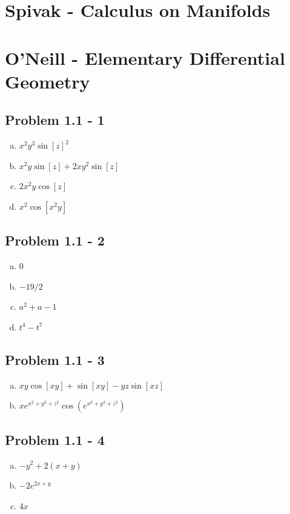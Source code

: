 \documentclass[10pt,a4paper]{book}
\theoremstyle{definition}
\begin{document}
\section{{\sc Spivak} - Calculus on Manifolds}

\section{{\sc O'Neill} - Elementary Differential Geometry}
\subsection{Problem 1.1 - 1}
\begin{enumerate}[(a)]
\item $x^2 y^3 \sin[z]^2$
\item $x^2 y \sin[z] + 2 x y^2 \sin[z]$
\item $2 x^2 y \cos[z]$
\item $x^2 \cos[x^2 y]$
\end{enumerate}

\subsection{Problem 1.1 - 2}
\begin{enumerate}[(a)]
\item $0$
\item $-19/2$
\item $a^2+a-1$
\item $t^4-t^7$
\end{enumerate}

\subsection{Problem 1.1 - 3}
\begin{enumerate}[(a)]
\item $xy \cos[x y] + \sin[x y] - y z \sin[x z]$
\item $ x e^{x^2 + y^2 + z^2} \cos(e^{x^2 + y^2 + z^2})$
\end{enumerate}

\subsection{Problem 1.1 - 4}
\begin{enumerate}[(a)]
\item $-y^2 + 2 (x + y)$
\item $-2 e^{2 x + y}$
\item $4x$
\end{enumerate}
\end{document}
